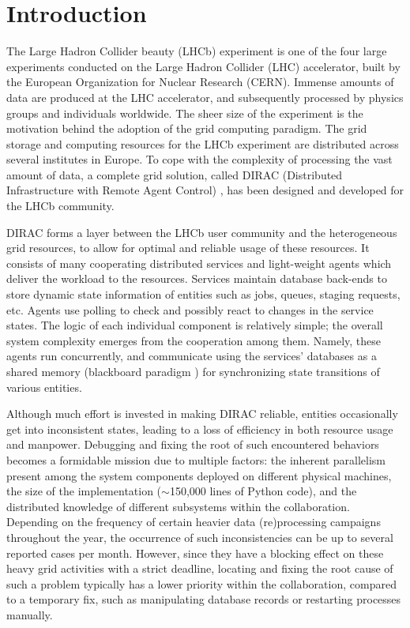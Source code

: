 \documentclass[sort&compress,preprint,3p]{elsarticle}
\begin{document}
\section{Introduction}

The Large Hadron Collider beauty (LHCb) experiment \cite{LHCb} is one of the
four large
experiments conducted on the Large Hadron Collider (LHC) accelerator, built by
the European Organization for Nuclear Research (CERN). Immense amounts of data
are produced at the LHC accelerator, and subsequently processed by physics
groups and individuals worldwide. The sheer size of the experiment is the
motivation behind the adoption of the grid computing paradigm. The grid storage
and computing resources for the LHCb experiment are distributed across several
institutes in Europe. To cope with the complexity of processing the vast amount
of data, a complete grid solution, called DIRAC (Distributed Infrastructure with
Remote Agent Control) \cite{DIRAC_CommGridSolution,DIRAC_ReliableDataMaangement}, 
has been designed and developed for the
LHCb
community.

DIRAC forms a layer between the LHCb user community and the heterogeneous
grid resources, to allow for optimal and reliable usage of these
resources. It consists of many cooperating distributed services and light-weight
agents which deliver the workload to the resources. 
Services maintain database back-ends to store
dynamic state information of entities such as jobs, queues, staging requests, etc. Agents use polling to check
and possibly react to changes in the service states.
The logic of each individual
component is relatively simple; the overall system complexity emerges from the
cooperation among them. Namely, these agents run concurrently, and communicate
using the services' databases as a shared memory (blackboard paradigm \cite{IEEEexample:blackboard_systems}) for
synchronizing state transitions of various entities.

Although much effort is invested in making DIRAC reliable, entities occasionally
get into inconsistent states, leading to a loss of efficiency in both
resource usage and manpower. Debugging and fixing the root of such encountered
behaviors becomes a formidable mission due to multiple factors: the inherent
parallelism present among the system components deployed on different physical
machines, the size of the implementation ($\sim$150,000 lines of Python code),
and the distributed knowledge of different subsystems within the collaboration.
Depending on the frequency of certain heavier data (re)processing campaigns throughout 
the year, the occurrence of such inconsistencies can be up to several reported cases 
per month. However, since they have a blocking effect on these heavy grid activities
with a strict deadline, locating and fixing the root cause of such a problem 
typically has a lower priority within the collaboration, compared to a temporary fix, 
such as manipulating database records or restarting processes manually.
\end{document}
